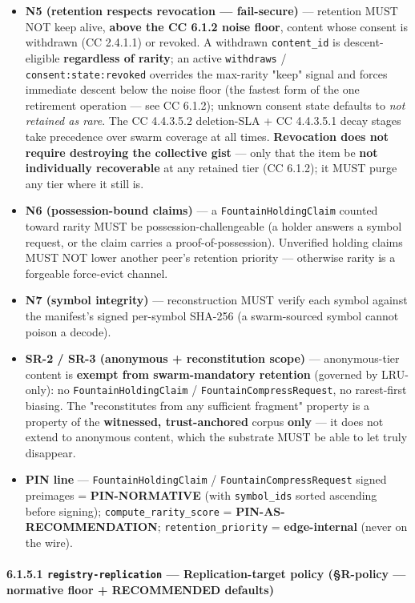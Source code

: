 \documentclass[11pt]{article}
\begin{document}
\begin{itemize}\setlength\itemsep{0pt}
\item \textbf{N5 (retention respects revocation — fail-secure)} — retention MUST NOT keep alive, \textbf{above the CC 6.1.2 noise floor}, content whose consent is withdrawn (CC 2.4.1.1) or revoked. A withdrawn \texttt{content\_id} is descent-eligible \textbf{regardless of rarity}; an active \texttt{withdraws} / \texttt{consent:state:revoked} overrides the max-rarity "keep" signal and forces immediate descent below the noise floor (the fastest form of the one retirement operation — see CC 6.1.2); unknown consent state defaults to \textit{not retained as rare}. The CC 4.4.3.5.2 deletion-SLA + CC 4.4.3.5.1 decay stages take precedence over swarm coverage at all times. \textbf{Revocation does not require destroying the collective gist} — only that the item be \textbf{not individually recoverable} at any retained tier (CC 6.1.2); it MUST purge any tier where it still is.
\item \textbf{N6 (possession-bound claims)} — a \texttt{FountainHoldingClaim} counted toward rarity MUST be possession-challengeable (a holder answers a symbol request, or the claim carries a proof-of-possession). Unverified holding claims MUST NOT lower another peer's retention priority — otherwise rarity is a forgeable force-evict channel.
\item \textbf{N7 (symbol integrity)} — reconstruction MUST verify each symbol against the manifest's signed per-symbol SHA-256 (a swarm-sourced symbol cannot poison a decode).
\item \textbf{SR-2 / SR-3 (anonymous + reconstitution scope)} — anonymous-tier content is \textbf{exempt from swarm-mandatory retention} (governed by LRU-only): no \texttt{FountainHoldingClaim} / \texttt{FountainCompressRequest}, no rarest-first biasing. The "reconstitutes from any sufficient fragment" property is a property of the \textbf{witnessed, trust-anchored} corpus \textbf{only} — it does not extend to anonymous content, which the substrate MUST be able to let truly disappear.
\item \textbf{PIN line} — \texttt{FountainHoldingClaim} / \texttt{FountainCompressRequest} signed preimages = \textbf{PIN-NORMATIVE} (with \texttt{symbol\_ids} sorted ascending before signing); \texttt{compute\_rarity\_score} = \textbf{PIN-AS-RECOMMENDATION}; \texttt{retention\_priority} = \textbf{edge-internal} (never on the wire).
\end{itemize}


\paragraph{6.1.5.1 \texttt{registry-replication} — Replication-target policy (§R-policy — normative floor + RECOMMENDED defaults)}\mbox{}\\
\end{document}
